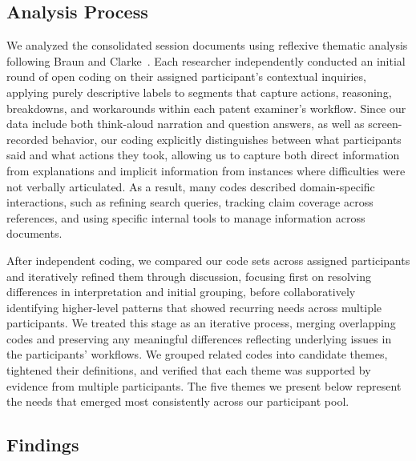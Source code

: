 \documentclass[sigconf]{acmart}
\begin{document}
\subsection{Analysis Process}

We analyzed the consolidated session documents using reflexive thematic
analysis following Braun and Clarke~\cite{Braun2006}. Each researcher
independently conducted an initial round of open coding on their assigned
participant's contextual inquiries, applying purely descriptive labels to
segments that capture actions, reasoning, breakdowns, and workarounds within
each patent examiner's workflow. Since our data include both think-aloud
narration and question answers, as well as screen-recorded behavior, our
coding explicitly distinguishes between what participants said and what
actions they took, allowing us to capture both direct information from
explanations and implicit information from instances where difficulties were
not verbally articulated. As a result, many codes described domain-specific
interactions, such as refining search queries, tracking claim coverage across
references, and using specific internal tools to manage information across
documents.

After independent coding, we compared our code sets across assigned
participants and iteratively refined them through discussion, focusing first
on resolving differences in interpretation and initial grouping, before
collaboratively identifying higher-level patterns that showed recurring needs
across multiple participants. We treated this stage as an iterative process,
merging overlapping codes and preserving any meaningful differences reflecting
underlying issues in the participants' workflows. We grouped related codes
into candidate themes, tightened their definitions, and verified that each
theme was supported by evidence from multiple participants. The five themes we
present below represent the needs that emerged most consistently across our
participant pool.

\subsection{Findings}
\end{document}
